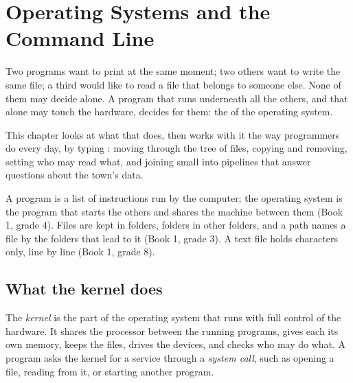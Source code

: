 \chapter{Operating Systems and the Command Line}\label{ch:g11:os-and-command-line}

Two programs want to print at the same moment; two others want to write the same file; a third would like to read a
file that belongs to someone else. None of them may decide alone. A program that runs underneath all the others, and
that alone may touch the hardware, decides for them: the  of the operating system.

This chapter looks at what that  does, then works with it the way programmers do every day, by typing :
moving through the tree of files, copying and removing, setting who may read what, and joining small  into
pipelines that answer questions about the town's data.

\begin{recall}
A program is a list of instructions run by the computer; the operating system is the program that starts the
others and shares the machine between them (Book 1, grade 4). Files are kept in folders, folders in other folders,
and a path names a file by the folders that lead to it (Book 1, grade 3). A text file holds characters only, line by
line (Book 1, grade 8).
\end{recall}

\section{What the kernel does}\label{sec:g11:os-and-command-line:kernel}

\begin{definition}\label{def:g11:os-and-command-line:kernel}
The \emph{kernel} is the part of the operating system that runs with full control of the hardware. It
shares the processor between the running programs, gives each its own memory, keeps the files, drives the devices,
and checks who may do what. A program asks the kernel for a service through a \emph{system call},
such as opening a file, reading from it, or starting another program.
\end{definition}

